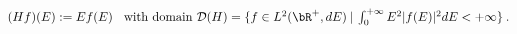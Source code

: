 \begin{equation}(Hf)(E) := Ef(E) \:\:\:\: \mbox{with domain ${\cal D}(H) = \{f\in L^2(\bR^+,dE) \:|\: \int_{0}^{+\infty} E^2 |f(E)|^2 dE <+\infty\}$}
\label{H} \:. \end{equation}

